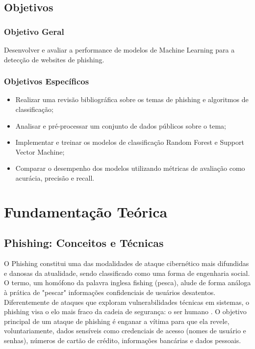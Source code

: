 \documentclass[12pt]{article}
\begin{document}
\subsection{Objetivos}
\subsubsection{Objetivo Geral}
Desenvolver e avaliar a performance de modelos de Machine Learning para a detecção de websites de phishing.

\subsubsection{Objetivos Específicos}
\begin{itemize}
    \item Realizar uma revisão bibliográfica sobre os temas de phishing e algoritmos de classificação;
    \item Analisar e pré-processar um conjunto de dados públicos sobre o tema;
    \item Implementar e treinar os modelos de classificação Random Forest e Support Vector Machine;
    \item Comparar o desempenho dos modelos utilizando métricas de avaliação como acurácia, precisão e recall.
\end{itemize}


\section{Fundamentação Teórica}
\label{sec:fundamentacao}
\subsection{Phishing: Conceitos e Técnicas}
\label{ssec:phishing_conceitos}

O Phishing constitui uma das modalidades de ataque cibernético mais difundidas e danosas da atualidade, sendo classificado como uma forma de engenharia social. O termo, um homófono da palavra inglesa fishing (pesca), alude de forma análoga à prática de "pescar" informações confidenciais de usuários desatentos. Diferentemente de ataques que exploram vulnerabilidades técnicas em sistemas, o phishing visa o elo mais fraco da cadeia de segurança: o ser humano \parencite{mandadi2022}. O objetivo principal de um ataque de phishing é enganar a vítima para que ela revele, voluntariamente, dados sensíveis como credenciais de acesso (nomes de usuário e senhas), números de cartão de crédito, informações bancárias e dados pessoais.
\end{document}
